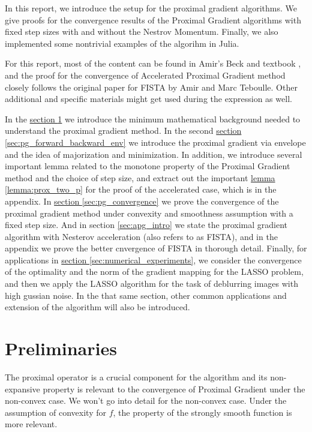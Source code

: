 \documentclass[]{article}
\theoremstyle{definition}
\begin{document}
    In this report, we introduce the setup for the proximal gradient algorithms. We give proofs for the convergence results of the Proximal Gradient algorithms with fixed step sizes with and without the Nestrov Momentum. Finally, we also implemented some nontrivial examples of the algorihm in Julia. 
    \par
    For this report, most of the content can be found in Amir's Beck and textbook \cite{book:first_order_opt}, and the proof for the convergence of Accelerated Proximal Gradient method closely follows the original paper for FISTA\cite{paper:FISTA} by Amir and Marc Teboulle. Other additional and specific materials might get used during the expression as well. 
    \par 
    In the \hyperref[sec:preliminaries]{section \ref*{sec:preliminaries}} we introduce the minimum mathematical background needed to understand the proximal gradient method. In the second \hyperref[sec:pg_forward_backward_env]{section \ref*{sec:pg_forward_backward_env}} we introduce the proximal gradient via envelope and the idea of majorization and minimization. In addition, we introduce several important lemma related to the monotone property of the Proximal Gradient method and the choice of step size, and extract out the important \hyperref[lemma:prox_two_p]{lemma \ref*{lemma:prox_two_p}} for the proof of the accelerated case, which is in the appendix. In \hyperref[sec:pg_convergence]{section \ref*{sec:pg_convergence}} we prove the convergence of the proximal gradient method under convexity and smoothness assumption with a fixed step size. And in section \ref*{sec:apg_intro} we state the proximal gradient algorithm with Nesterov acceleration (also refers to as FISTA), and in the appendix we prove the better cnvergence of FISTA in thorough detail. Finally, for applications in \hyperref[sec:numerical_experiments]{section \ref*{sec:numerical_experiments}}, we consider the convergence of the optimality and the norm of the gradient mapping for the LASSO problem, and then we apply the LASSO algorithm for the task of deblurring images with high gussian noise. In the that same section, other common applications and extension of the algorithm will also be introduced. 

\section{Preliminaries}\label{sec:preliminaries}
    The proximal operator is a crucial component for the algorithm and its non-expansive  property is relevant to the convergence of Proximal Gradient under the non-convex case. We won't go into detail for the non-convex case. Under the assumption of convexity for $f$, the property of the strongly smooth function is more relevant. 
\end{document}

